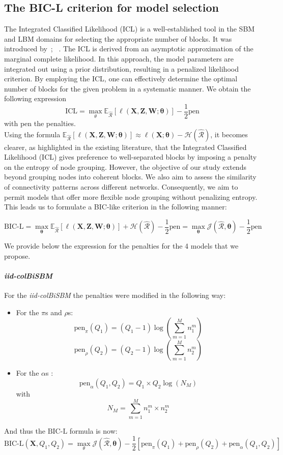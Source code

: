 \documentclass[12pt,a4paper]{report}
\begin{document}
\subsection{The BIC-L criterion for model selection}
\label{ssec:the-bic-l-criterion-for-model-selection}
The Integrated Classified Likelihood (ICL) is a well-established tool in the SBM
and LBM domains for selecting the appropriate number of blocks. It was
introduced by~\cite{biernackiAssessingMixtureModel2000};
~\cite{daudinMixtureModelRandom2008}. The ICL is derived from an asymptotic
approximation of the marginal complete likelihood. In this approach, the model
parameters are integrated out using a prior distribution, resulting in a
penalized likelihood criterion. By employing the ICL, one can effectively
determine the optimal number of blocks for the given problem in a systematic
manner.
We obtain the following expression
\[
    \text{ICL} = \max_{\theta} \mathbb{E}_{\widehat{\mathcal{R}}} [\ell(\bm{X,Z,W;\theta})] - \frac{1}{2}\text{pen}
\]
with pen the penalties.\\
Using the formula $\mathbb{E}_{\widehat{\mathcal{R}}} [\ell(\bm{X,Z,W;\theta})] \approx \ell (\bm{X;\theta}) - \mathcal{H(\widehat{R})}$,
it becomes clearer, as highlighted in the existing literature, that the
Integrated Classified Likelihood (ICL) gives preference to well-separated blocks
by imposing a penalty on the entropy of node grouping. However, the objective of
our study extends beyond grouping nodes into coherent blocks. We also aim to
assess the similarity of connectivity patterns across different networks.
Consequently, we aim to permit models that offer more flexible node grouping
without penalizing entropy. This leads us to formulate a BIC-like criterion in
the following manner:

\[
    \text{BIC-L} = \max_{\bm{\theta}} \mathbb{E}_{\widehat{\mathcal{R}}} [\ell(\bm{X,Z,W;\theta})] + \mathcal{H(\widehat{R})} - \frac{1}{2}\text{pen} = \max_{\bm{\theta}} \mathcal{J(\widehat{R}, \bm{\theta})} - \frac{1}{2}\text{pen}
\]

We provide below the expression for the penalties for the 4 models that we
propose.

\paragraph*{\textit{iid-colBiSBM}}
For the \textit{iid-colBiSBM} the penalties were modified in the following way:

\begin{itemize}
    \item For the $\pi$s and $\rho$s:
          \[\text{pen}_{\pi}(Q_1) = (Q_1 - 1)\log(\sum_{m=1}^{M}n_{1}^{m})\]
          \[\text{pen}_{\rho}(Q_2) = (Q_2 - 1)\log(\sum_{m=1}^{M}n_{2}^{m})\]
    \item For the $\alpha$s :
          \[\text{pen}_{\alpha}(Q_1, Q_2) = Q_1 \times Q_2 \log(N_M)\]
          with
          \[ N_M = \sum_{m = 1}^{M} n_{1}^{m} \times n_{2}^{m} \]
\end{itemize}
And thus the $\text{BIC-L}$ formula is now:
\[ \text{BIC-L}(\bm{X},Q_1, Q_2) = \max_{\theta} \mathcal{J} (\mathcal{\hat{R}}, \bm{\theta})
    - \frac{1}{2} [\text{pen}_{\pi}(Q_1) + \text{pen}_{\rho}(Q_2) + \text{pen}_{\alpha}(Q_1, Q_2)]\]
\end{document}
